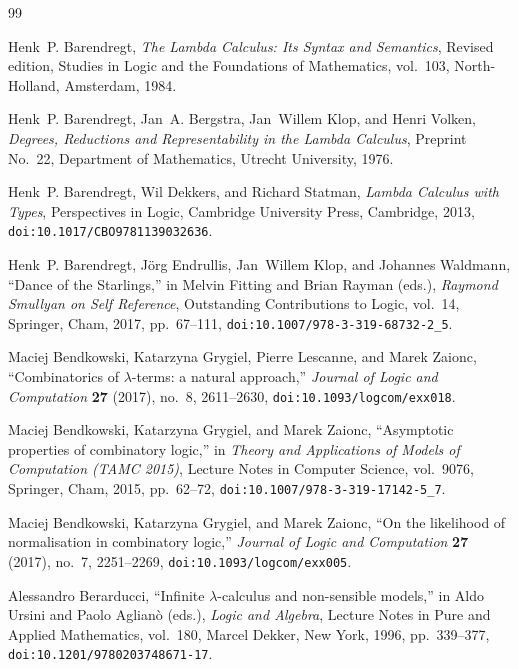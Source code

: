 \documentclass[11pt,reqno]{amsart}
\numberwithin{equation}{section}
\theoremstyle{plain}
\theoremstyle{definition}
\theoremstyle{remark}
\begin{document}
\begin{thebibliography}{99}



Henk~P. Barendregt,
\emph{The Lambda Calculus: Its Syntax and Semantics},
Revised edition, Studies in Logic and the Foundations of Mathematics, vol.~103,
North-Holland, Amsterdam, 1984.

Henk~P. Barendregt, Jan~A. Bergstra, Jan~Willem Klop, and Henri Volken,
\emph{Degrees, Reductions and Representability in the Lambda Calculus},
Preprint No.~22, Department of Mathematics, Utrecht University, 1976.

Henk~P. Barendregt, Wil Dekkers, and Richard Statman,
\emph{Lambda Calculus with Types},
Perspectives in Logic, Cambridge University Press, Cambridge, 2013,
\texttt{doi:10.1017/CBO9781139032636}.

Henk~P. Barendregt, J{\"o}rg Endrullis, Jan~Willem Klop, and Johannes Waldmann,
``Dance of the Starlings,''
in Melvin Fitting and Brian Rayman (eds.), \emph{Raymond Smullyan on Self Reference},
Outstanding Contributions to Logic, vol.~14, Springer, Cham, 2017, pp.~67--111,
\texttt{doi:10.1007/978-3-319-68732-2\_5}.

Maciej Bendkowski, Katarzyna Grygiel, Pierre Lescanne, and Marek Zaionc,
``Combinatorics of $\lambda$-terms: a natural approach,''
\emph{Journal of Logic and Computation} \textbf{27} (2017), no.~8, 2611--2630,
\texttt{doi:10.1093/logcom/exx018}.

Maciej Bendkowski, Katarzyna Grygiel, and Marek Zaionc,
``Asymptotic properties of combinatory logic,''
in \emph{Theory and Applications of Models of Computation (TAMC 2015)},
Lecture Notes in Computer Science, vol.~9076, Springer, Cham, 2015, pp.~62--72,
\texttt{doi:10.1007/978-3-319-17142-5\_7}.

Maciej Bendkowski, Katarzyna Grygiel, and Marek Zaionc,
``On the likelihood of normalisation in combinatory logic,''
\emph{Journal of Logic and Computation} \textbf{27} (2017), no.~7, 2251--2269,
\texttt{doi:10.1093/logcom/exx005}.

Alessandro Berarducci,
``Infinite $\lambda$-calculus and non-sensible models,''
in Aldo Ursini and Paolo Aglian{\`o} (eds.), \emph{Logic and Algebra},
Lecture Notes in Pure and Applied Mathematics, vol.~180, Marcel Dekker, New York, 1996, pp.~339--377,
\texttt{doi:10.1201/9780203748671-17}.


\end{thebibliography}
\end{document}
